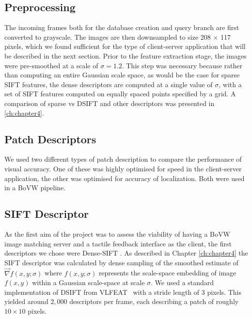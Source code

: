 \subsection{Preprocessing}

The incoming frames both for the database creation and query branch are first converted to grayscale. The images are then downsampled to size 208 $\times$ 117 pixels, which we found sufficient for the type of client-server application that will be described in the next section. Prior to the feature extraction stage, the images were pre-smoothed at a scale of $\sigma = 1.2$. This step was necessary because rather than computing an entire Gaussian scale space, as would be the case for sparse SIFT features, the dense descriptors are computed at a single value of $\sigma$, with a set of SIFT features computed on equally spaced points specified by a grid. A comparison of sparse vs DSIFT and other descriptors was presented in \ref{ch:chapter4}.

\subsection{Patch Descriptors}
We used two different types of patch description to compare the performance of visual accuracy.  One of these was highly optimised for speed in the client-server application, the other was optimised for accuracy of localization.  Both were used in a BoVW pipeline.


\subsection{SIFT Descriptor}
As the first aim of the project was to assess the viability of having a BoVW image matching server and a tactile feedback interface as the client, the first descriptors we chose were Dense-SIFT \citep{Lowe1999,LazebnikSP06,Vedaldi2008}. As described in Chapter \ref{ch:chapter4} the SIFT descriptor was calculated by dense sampling of the smoothed estimate of $\vec{\nabla}f(x,y;\sigma)$ where $f(x,y;\sigma)$ represents the scale-space embedding of image $f(x,y)$ within a Gaussian scale-space at scale $\sigma$.  We used a standard implementation of DSIFT from VLFEAT~\citep{Vedaldi2008} with a stride length of 3 pixels. This yielded around $2,000$ descriptors per frame, each describing a patch of roughly $10 \times 10$ pixels.

